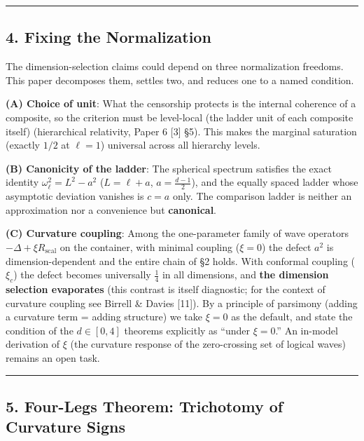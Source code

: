 \documentclass[
]{article}
\begin{document}
\begin{center}\rule{0.5\linewidth}{0.5pt}\end{center}

\subsection{4. Fixing the Normalization}\label{fixing-the-normalization}

The dimension-selection claims could depend on three normalization
freedoms. This paper decomposes them, settles two, and reduces one to a
named condition.

\textbf{(A) Choice of unit}: What the censorship protects is the
internal coherence of a composite, so the criterion must be level-local
(the ladder unit of each composite itself) (hierarchical relativity,
Paper 6 {[}3{]} §5). This makes the marginal saturation (exactly \(1/2\)
at \(\ell=1\)) universal across all hierarchy levels.

\textbf{(B) Canonicity of the ladder}: The spherical spectrum satisfies
the exact identity \(\omega_\ell^2=L^2-a^2\) (\(L=\ell+a\),
\(a=\tfrac{d-1}2\)), and the equally spaced ladder whose asymptotic
deviation vanishes is \(c=a\) only. The comparison ladder is neither an
approximation nor a convenience but \textbf{canonical}.

\textbf{(C) Curvature coupling}: Among the one-parameter family of wave
operators \(-\Delta+\xi R_{\mathrm{scal}}\) on the container, with
minimal coupling (\(\xi=0\)) the defect \(a^2\) is dimension-dependent
and the entire chain of §2 holds. With conformal coupling (\(\xi_c\))
the defect becomes universally \(\tfrac14\) in all dimensions, and
\textbf{the dimension selection evaporates} (this contrast is itself
diagnostic; for the context of curvature coupling see Birrell \& Davies
{[}11{]}). By a principle of parsimony (adding a curvature term = adding
structure) we take \(\xi=0\) as the default, and state the condition of
the \(d\in[0,4]\) theorems explicitly as ``under \(\xi=0\).'' An
in-model derivation of \(\xi\) (the curvature response of the
zero-crossing set of logical waves) remains an open task.

\begin{center}\rule{0.5\linewidth}{0.5pt}\end{center}

\subsection{5. Four-Legs Theorem: Trichotomy of Curvature
Signs}\label{four-legs-theorem-trichotomy-of-curvature-signs}
\end{document}
